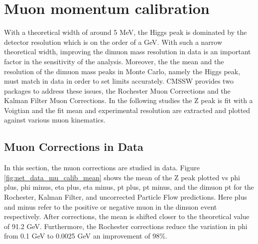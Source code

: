 \section{Muon momentum calibration}
\label{muon_calib}

With a theoretical width of around 5 MeV, the Higgs peak is dominated by the detector resolution which is on the order of a GeV. With such a narrow theoretical width, improving the dimuon mass resolution in data is an important factor in the sensitivity of the analysis. Moreover, the the mean and the resolution of the dimuon mass peaks in Monte Carlo, namely the Higgs peak, must match in data in order to set limits accurately. CMSSW provides two packages to address these issues, the Rochester Muon Corrections and the Kalman Filter Muon Corrections. In the following studies the Z peak is fit with a Voigtian and the fit mean and experimental resolution are extracted and plotted against various muon kinematics.

\subsection{Muon Corrections in Data}

In this section, the muon corrections are studied in data. Figure \ref{fig:net_data_mu_calib_mean} shows the mean of the Z peak plotted vs phi plus, phi minus, eta plus, eta minus, pt plus, pt minus, and the dimuon pt for the Rochester, Kalman Filter, and uncorrected Particle Flow predictions. Here plus and minus refer to the positive or negative muon in the dimuon event respectively. After corrections, the mean is shifted closer to the theoretical value of 91.2 GeV. Furthermore, the Rochester corrections reduce the variation in phi from 0.1 GeV to 0.0025 GeV an improvement of 98\%.

